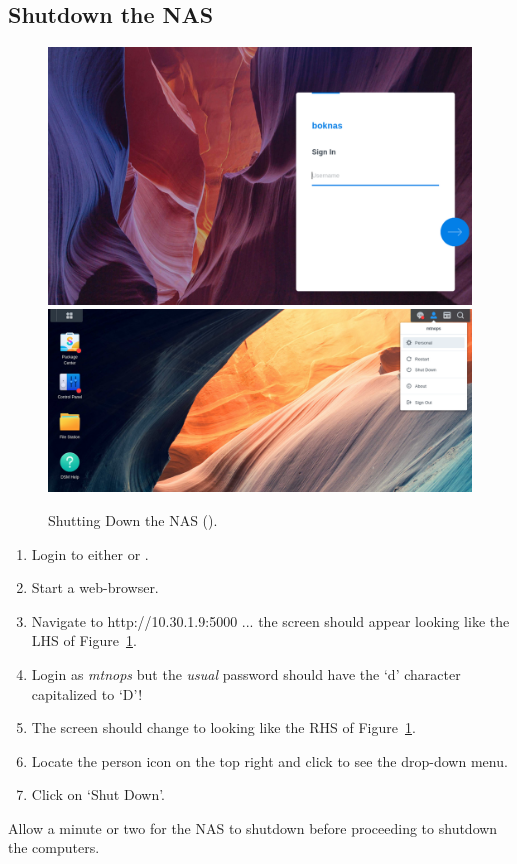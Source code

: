 \documentclass[12pt,twoside]{article}
\begin{document}
\subsection{Shutdown the NAS}
\begin{figure}[!h]
 \centering
 \includegraphics[width=0.45\linewidth]{boknas1.png}
 \includegraphics[width=0.45\linewidth]{boknas3.png}
 \caption{Shutting Down the NAS ().}
 \label{boknasshutdown}
\end{figure}

\begin{enumerate}
\item Login to either  or .
\item Start a web-browser.
\item Navigate to http://10.30.1.9:5000 ... the screen should appear looking like the LHS of Figure~\ref{boknasshutdown}.
\item Login as \emph{mtnops} but the \emph{usual} password should have the `d' character capitalized to `D'!
\item The screen should change to looking like the RHS of Figure~\ref{boknasshutdown}.
\item Locate the person icon on the top right and click to see the drop-down menu.
\item Click on `Shut Down'.
\end{enumerate}

Allow a minute or two for the NAS to shutdown before proceeding to shutdown the computers.
\end{document}
